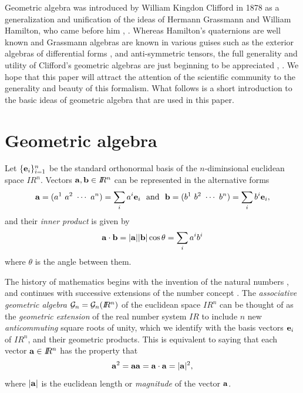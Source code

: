 \documentclass[12]{article}
\def\ba{{\bf a}}
\def\bb{{\bf b}}
\def\be{{\bf e}}
\def\R{I\!\!R}
\def\G{I\!\!\!G}
\def \G {{\cal G}}
\begin{document}
Geometric algebra was introduced by William Kingdon Clifford in 1878 as a generalization and unification
of the ideas of Hermann Grassmann and William Hamilton, who came before him 
\cite{Clifford}, \cite{Crowe1985}. Whereas Hamilton's quaternions are
well known and Grassmann algebras are known in various guises such as the exterior algebras of differential 
forms \cite{RS}, and anti-symmetric tensors, the full 
generality and utility of Clifford's geometric algebras are just beginning to be
appreciated \cite{EBGS}, \cite{DDL}. We hope that this paper will attract the attention of the 
scientific community to the generality and beauty of this formalism. 
What follows is a short introduction to the basic ideas of geometric algebra
that are used in this paper. 

\section*{Geometric algebra}

   Let $\{\be_i\}_{i=1}^n$ be the standard orthonormal basis of the $n$-diminsional euclidean space
 $\R^n$. Vectors $\ba, \bb \in \R^n$ can be represented in the alternative forms
   \[ \ba=(a^1 \ a^2 \ \cdots \ a^n) = \sum_i a^i \be_i \ \ {\rm and} \ \
    \bb=(b^1 \ b^2 \ \cdots \ b^n) = \sum_i b^i \be_i,\]
  and their {\it inner product} is given by 
    \[\ba \cdot \bb=|\ba||\bb|\cos \theta = \sum_i a^i b^i  \]
 where $\theta$ is the angle between them.     

The history of mathematics begins with the invention of the natural numbers \cite{D1954}, and
continues with successive extensions of the number concept \cite{St}.      
The {\it associative geometric algebra} $\G_n=\G_n(\R^n)$ of the 
euclidean space $\R^n$ can be thought of as the {\it geometric
extension} of the real number system $\R$ to include $n$ new {\it anticommuting} square roots of unity, which we
identify with the basis vectors $\be_i$ of $\R^n$, and their geometric products. 
This is equivalent to saying that 
each vector $\ba \in \R^n$ has the property that 
  \[  \ba^2 = \ba \ba = \ba\cdot \ba = |\ba|^2, \]
where $|\ba|$ is the euclidean length or {\it magnitude} of the vector $\ba$.  
\end{document}
